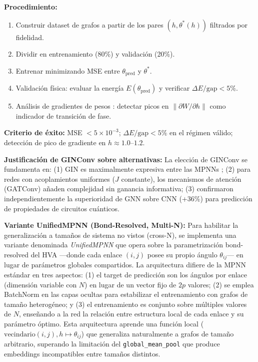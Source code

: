 \documentclass[11pt,a4paper,spanish]{book}
\begin{document}
\textbf{Procedimiento:}
\begin{enumerate}
    \item Construir dataset de grafos a partir de los pares $(h, \theta^*(h))$ filtrados por fidelidad.
    \item Dividir en entrenamiento (80\%) y validación (20\%).
    \item Entrenar minimizando MSE entre $\theta_{\text{pred}}$ y $\theta^*$.
    \item Validación física: evaluar la energía $E(\theta_{\text{pred}})$ y verificar $\Delta E/\text{gap} < 5\%$.
    \item Análisis de gradientes de pesos \citep{hernandes2025}: detectar picos en $\|\partial W / \partial h\|$ como indicador de transición de fase.
\end{enumerate}

\textbf{Criterio de éxito:} MSE $< 5 \times 10^{-3}$; $\Delta E/\text{gap} < 5\%$ en el régimen válido; detección de pico de gradiente en $h \approx 1.0$--$1.2$.

\textbf{Justificación de GINConv sobre alternativas:} La elección de GINConv se fundamenta en: (1) GIN es maximalmente expresiva entre las MPNNs \citep{xu2019}; (2) para redes con acoplamientos uniformes ($J$ constante), los mecanismos de atención (GATConv) añaden complejidad sin ganancia informativa; (3) \citet{meng2025} confirmaron independientemente la superioridad de GNN sobre CNN (+36\%) para predicción de propiedades de circuitos cuánticos.

\textbf{Variante UnifiedMPNN (Bond-Resolved, Multi-N):} Para habilitar la generalización a tamaños de sistema no vistos (cross-N), se implementa una variante denominada \emph{UnifiedMPNN} que opera sobre la parametrización bond-resolved del HVA ---donde cada enlace $(i,j)$ posee su propio ángulo $\theta_{ij}$--- en lugar de parámetros globales compartidos. La arquitectura difiere de la MPNN estándar en tres aspectos: (1) el target de predicción son los ángulos por enlace (dimensión variable con $N$) en lugar de un vector fijo de $2p$ valores; (2) se emplea BatchNorm en las capas ocultas para estabilizar el entrenamiento con grafos de tamaño heterogéneo; y (3) el entrenamiento es conjunto sobre múltiples valores de $N$, enseñando a la red la relación entre estructura local de cada enlace y su parámetro óptimo. Esta arquitectura aprende una función local ($\text{vecindario}(i,j), h \mapsto \theta_{ij}$) que generaliza naturalmente a grafos de tamaño arbitrario, superando la limitación del \texttt{global\_mean\_pool} que produce embeddings incompatibles entre tamaños distintos.
\end{document}
